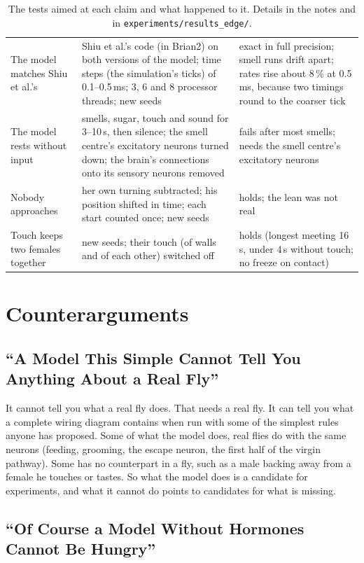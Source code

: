 \documentclass[11pt,a4paper]{article}
\begin{document}
\begin{table}[tbp]
\begin{tabularx}{\textwidth}{@{}>{\RaggedRight}p{3.9cm}>{\RaggedRight}X>{\RaggedRight\arraybackslash}p{3.3cm}@{}}
The model matches Shiu et al.'s & Shiu et al.'s code (in Brian2) on both versions of the model; time steps (the simulation's ticks) of 0.1--0.5\,ms; 3, 6 and 8 processor threads; new seeds & exact in full precision; smell runs drift apart; rates rise about 8\,\% at 0.5\,ms, because two timings round to the coarser tick \\
The model rests without input & smells, sugar, touch and sound for 3--10\,s, then silence; the smell centre's excitatory neurons turned down; the brain's connections onto its sensory neurons removed & fails after most smells; needs the smell centre's excitatory neurons \\
Nobody approaches & her own turning subtracted; his position shifted in time; each start counted once; new seeds & holds; the lean was not real \\
Touch keeps two females together & new seeds; their touch (of walls and of each other) switched off & holds (longest meeting 16\,s, under 4\,s without touch; no freeze on contact) \\
\bottomrule
\end{tabularx}
\caption{The tests aimed at each claim and what happened to it. Details in the notes and in \texttt{experiments/results\_edge/}.}
\label{tab:breaking}
\end{table}

\section{Counterarguments}
\label{sec:counterarguments}

\subsection{``A Model This Simple Cannot Tell You Anything About a Real Fly''}

It cannot tell you what a real fly does. That needs a real fly. It can tell you what a complete wiring diagram contains when run with some of the simplest rules anyone has proposed. Some of what the model does, real flies do with the same neurons (feeding, grooming, the escape neuron, the first half of the virgin pathway). Some has no counterpart in a fly, such as a male backing away from a female he touches or tastes. So what the model does is a candidate for experiments, and what it cannot do points to candidates for what is missing.

\subsection{``Of Course a Model Without Hormones Cannot Be Hungry''}
\end{document}

